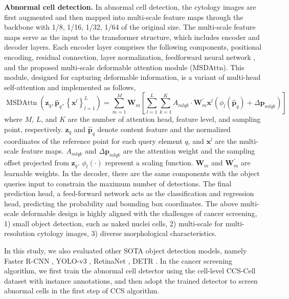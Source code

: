 \noindent \textbf{Abnormal cell detection.} In abnormal cell detection, the cytology images are first augmented and then mapped into multi-scale feature maps through the backbone with 1/8, 1/16, 1/32, 1/64 of the original size. The multi-scale feature maps serve as the input to the transformer structure, which includes encoder and decoder layers. Each encoder layer comprises the following components, positional encoding, residual connection, layer normalization, feedforward neural network \cite{dosovitskiy2020image}, and the proposed multi-scale deformable attention module (MSDAttn). This module, designed for capturing deformable information, is a variant of multi-head self-attention \cite{dosovitskiy2020image} and implemented as follows,
\begin{equation}
\operatorname{MSDAttn}\left(\boldsymbol{z}_q, \hat{\boldsymbol{p}}_q,\left\{\boldsymbol{x}^l\right\}_{l=1}^L\right)=\sum_{m=1}^M \boldsymbol{W}_m\left[\sum_{l=1}^L \sum_{k=1}^K A_{m l q k} \cdot \boldsymbol{W}_m^{\prime} \boldsymbol{x}^l\left(\phi_l\left(\hat{\boldsymbol{p}}_q\right)+\Delta \boldsymbol{p}_{m l q k}\right)\right]
\end{equation}
where $M$, $L$, and $K$ are the number of attention head, feature level, and sampling point, respectively. $\boldsymbol{z}_q$ and $\hat{\boldsymbol{p}}_q$ denote content feature and the normalized coordinates of the reference point for each query element $q$, and $\boldsymbol{x}^l$ are the multi-scale feature maps.  $A_{m l q k}$ and $\Delta \boldsymbol{p}_{m l q k}$ are the attention weight and the sampling offset projected from $\boldsymbol{z}_q$. $\phi_l\left( \cdot \right)$ represent a scaling function. $\boldsymbol{W}_m$ and $\boldsymbol{W}_m^{\prime}$ are learnable weights. 
In the decoder, there are the same components with the object queries input to constrain the maximum number of detections. The final prediction head, a feed-forward network acts as the classification and regression head, predicting the probability and bounding box coordinates. The above multi-scale deformable design is highly aligned with the challenges of cancer screening, 1) small object detection, such as naked nuclei cells, 2) multi-scale for multi-resolution cytology images, 3) diverse morphological characteristics. 

In this study, we also evaluated other SOTA object detection models, namely Faster R-CNN \cite{ren2015faster}, YOLO-v3 \cite{redmon2018yolov3}, RetinaNet \cite{lin2017focal}, DETR \cite{carion2020end}. In the cancer screening algorithm, we first train the abnormal cell detector using the cell-level CCS-Cell dataset with instance annotations, and then adopt the trained detector to screen abnormal cells in the first step of CCS algorithm.

